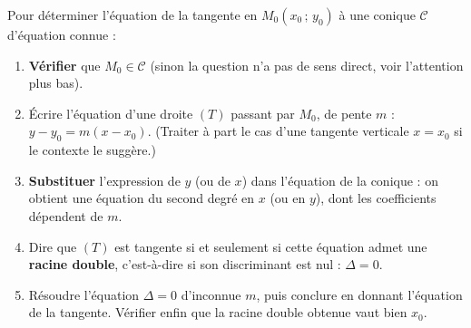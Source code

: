 \documentclass[11pt]{article}
\begin{document}
\begin{methode}[Déterminer une tangente par la condition $\Delta = 0$ — méthode exigible au Bac]
Pour déterminer l'équation de la tangente en $M_0(x_0\,;\,y_0)$ à une conique $\mathcal{C}$ d'équation connue :
\begin{enumerate}
\item \textbf{Vérifier} que $M_0 \in \mathcal{C}$ (sinon la question n'a pas de sens direct, voir l'attention plus bas).
\item Écrire l'équation d'une droite $(T)$ passant par $M_0$, de pente $m$ : $y - y_0 = m(x - x_0)$. (Traiter à part le cas d'une tangente verticale $x = x_0$ si le contexte le suggère.)
\item \textbf{Substituer} l'expression de $y$ (ou de $x$) dans l'équation de la conique : on obtient une équation du second degré en $x$ (ou en $y$), dont les coefficients dépendent de $m$.
\item Dire que $(T)$ est tangente si et seulement si cette équation admet une \textbf{racine double}, c'est-à-dire si son discriminant est nul : $\Delta = 0$.
\item Résoudre l'équation $\Delta = 0$ d'inconnue $m$, puis conclure en donnant l'équation de la tangente. Vérifier enfin que la racine double obtenue vaut bien $x_0$.
\end{enumerate}
\end{methode}
\end{document}
